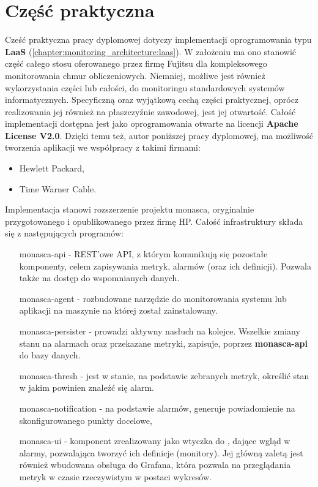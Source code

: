 \chapter{Część praktyczna}
\label{chapter:application}


Cześć praktyczna pracy dyplomowej dotyczy implementacji oprogramowania typu \textbf{LaaS} (\ref{chapter:monitoring_architecture:laas}).
W założeniu ma ono stanowić część całego stosu oferowanego przez firmę Fujitsu dla kompleksowego monitorowania chmur obliczeniowych.
Niemniej, możliwe jest również wykorzystania części lub całości, do monitoringu standardowych systemów informatycznych. 
Specyficzną oraz wyjątkową cechą części praktycznej, oprócz realizowania jej również na płaszczyźnie zawodowej, jest jej otwartość.
Całość implementacji dostępna jest jako oprogramowania otwarte na licencji \textbf{Apache License V2.0}. Dzięki temu też, autor poniższej pracy dyplomowej, ma możliwość tworzenia aplikacji we współpracy z takimi firmami:
\begin{itemize}
    \item Hewlett Packard,
    \item Time Warner Cable.
\end{itemize}

Implementacja stanowi rozszerzenie projektu monasca, oryginalnie przygotowanego i opublikowanego przez firmę HP.
Całość infrastruktury składa się z następujących programów:
\begin{itemize}
    \item[monasca-api] - REST'owe API, z którym komunikują się pozostałe komponenty, celem zapisywania metryk, alarmów (oraz ich definicji).
    Pozwala także na dostęp do wspomnianych danych.
    \item[monasca-agent] - rozbudowane narzędzie do monitorowania systemu lub aplikacji na maszynie na której został zainstalowany.
    \item[monasca-persister] - prowadzi aktywny nasłuch na kolejce. Wszelkie zmiany stanu na alarmach oraz przekazane metryki, zapisuje,
    poprzez \textbf{monasca-api} do bazy danych.
    \item[monasca-thresh] - jest w stanie, na podstawie zebranych metryk, określić stan w jakim powinien znaleźć się alarm.
    \item[monasca-notification] - na podstawie alarmów, generuje powiadomienie na skonfigurowanego punkty docelowe,
    \item[monasca-ui] - komponent zrealizowany jako wtyczka do , dające wgląd w alarmy, pozwalająca tworzyć ich definicje (monitory).
    Jej główną zaletą jest również wbudowana obsługa do Grafana, która pozwala na przeglądania metryk w czasie rzeczywistym w postaci wykresów.
\end{itemize}

